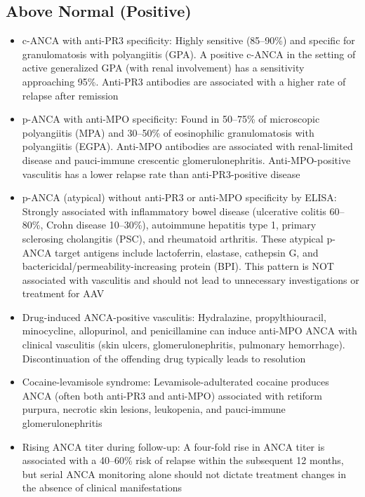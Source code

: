 \subsection*{Above Normal (Positive)}
\begin{itemize}
  \item c-ANCA with anti-PR3 specificity: Highly sensitive (85--90\%) and specific for granulomatosis with polyangiitis (GPA). A positive c-ANCA in the setting of active generalized GPA (with renal involvement) has a sensitivity approaching 95\%. Anti-PR3 antibodies are associated with a higher rate of relapse after remission
  \item p-ANCA with anti-MPO specificity: Found in 50--75\% of microscopic polyangiitis (MPA) and 30--50\% of eosinophilic granulomatosis with polyangiitis (EGPA). Anti-MPO antibodies are associated with renal-limited disease and pauci-immune crescentic glomerulonephritis. Anti-MPO-positive vasculitis has a lower relapse rate than anti-PR3-positive disease
  \item p-ANCA (atypical) without anti-PR3 or anti-MPO specificity by ELISA: Strongly associated with inflammatory bowel disease (ulcerative colitis 60--80\%, Crohn disease 10--30\%), autoimmune hepatitis type 1, primary sclerosing cholangitis (PSC), and rheumatoid arthritis. These atypical p-ANCA target antigens include lactoferrin, elastase, cathepsin G, and bactericidal/permeability-increasing protein (BPI). This pattern is NOT associated with vasculitis and should not lead to unnecessary investigations or treatment for AAV
  \item Drug-induced ANCA-positive vasculitis: Hydralazine, propylthiouracil, minocycline, allopurinol, and penicillamine can induce anti-MPO ANCA with clinical vasculitis (skin ulcers, glomerulonephritis, pulmonary hemorrhage). Discontinuation of the offending drug typically leads to resolution
  \item Cocaine-levamisole syndrome: Levamisole-adulterated cocaine produces ANCA (often both anti-PR3 and anti-MPO) associated with retiform purpura, necrotic skin lesions, leukopenia, and pauci-immune glomerulonephritis
  \item Rising ANCA titer during follow-up: A four-fold rise in ANCA titer is associated with a 40--60\% risk of relapse within the subsequent 12 months, but serial ANCA monitoring alone should not dictate treatment changes in the absence of clinical manifestations
\end{itemize}

